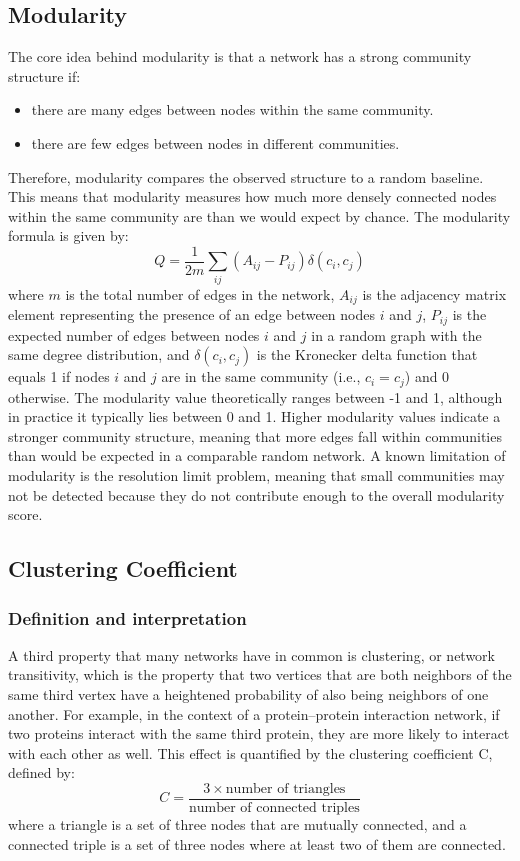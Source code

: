  \subsection{Modularity}
 The core idea behind modularity is that a network has a strong community structure if:
\begin{itemize}
    \item there are many edges between nodes within the same community.
    \item there are few edges between nodes in different communities.
\end{itemize}
Therefore, modularity compares the observed structure to a random baseline. This means
that modularity measures how much more densely connected nodes within the same community are than 
we would expect by chance. The modularity formula is given by:
\[Q = \frac{1}{2m} \sum_{ij} (A_{ij} - P_{ij}) \delta(c_i, c_j)\]
where $m$ is the total number of edges in the network,
 $A_{ij}$ is the adjacency matrix element representing the presence 
 of an edge between nodes $i$ and $j$, $P_{ij}$ is the expected number of edges
  between nodes $i$ and $j$ in a random graph with the same degree distribution, 
  and $\delta(c_i, c_j)$ is the Kronecker delta function that equals 1 if nodes $i$ and $j$ 
  are in the same community (i.e., $c_i = c_j$) and 0 otherwise.
The modularity value theoretically ranges between -1 and 1,
although in practice it typically lies between 0 and 1. 
Higher modularity values indicate a stronger community structure, 
meaning that more edges fall within communities than would be expected in a comparable random network.
A known limitation of modularity is the resolution limit problem,
meaning that small communities may not be detected because they do not contribute
enough to the overall modularity score.
\subsection{Clustering Coefficient}
\subsubsection{Definition and interpretation}
A third property that many networks have in common is clustering, or network transitivity,
which is the property that two vertices that are both neighbors of the same third vertex have 
a heightened probability of also being neighbors of one another. For example, in the context
of a protein–protein interaction network, if two proteins interact with the same third protein,
they are more likely to interact with each other as well. This effect is quantified
by the clustering coefficient C, defined by:
\[C = \frac{3 \times \text{number of triangles}}{\text{number of connected triples}}\]
where a triangle is a set of three nodes that are mutually connected, 
and a connected triple is a set of three nodes where at least two of them are connected.





